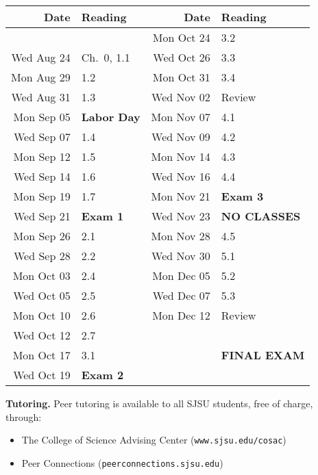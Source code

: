 \documentclass[letterpaper]{article}
\begin{document}
\begin{center}
\begin{tabular}{|r|p{1.5in}||r|p{1.5in}|}\hline
Date & Reading & Date & Reading \\ \hline
 &  & 
  Mon Oct 24 & 3.2 \\
Wed Aug 24 & Ch.\ 0, 1.1 &
	Wed Oct 26 & 3.3 \\ \hline
%
Mon Aug 29 & 1.2 &
	Mon Oct 31 & 3.4 \\
Wed Aug 31 & 1.3 &
	Wed Nov 02 & Review \\ \hline
%
Mon Sep 05 & {\bf Labor Day\/} &
	Mon Nov 07 & 4.1 \\
Wed Sep 07 & 1.4 &
	Wed Nov 09 & 4.2 \\ \hline
%
Mon Sep 12 & 1.5 &
	Mon Nov 14 & 4.3 \\
Wed Sep 14 & 1.6 &
	Wed Nov 16 & 4.4 \\ \hline
%
Mon Sep 19 & 1.7 &
	Mon Nov 21 & {\bf Exam 3\/} \\
Wed Sep 21 & {\bf Exam 1\/} &
	Wed Nov 23 & {\bf NO CLASSES\/} \\ \hline
%
Mon Sep 26 & 2.1 &
	Mon Nov 28 & 4.5 \\
Wed Sep 28 & 2.2 &
	Wed Nov 30 & 5.1 \\ \hline
%
Mon Oct 03 & 2.4 &
	Mon Dec 05 & 5.2 \\
Wed Oct 05 & 2.5 &
	Wed Dec 07 & 5.3 \\ \hline
%
Mon Oct 10 & 2.6 &
  Mon Dec 12 & Review \\
Wed Oct 12 & 2.7 &
   &  \\ \hline
%
Mon Oct 17 & 3.1 &
	{\bf \finaldate\/} & {\bf FINAL EXAM} \\
Wed Oct 19 & {\bf Exam 2\/} &
	& {\bf \finaltime\/} \\ \hline
\end{tabular}
\end{center}

{\bf Tutoring.\/} Peer tutoring is available to all SJSU
students, free of charge, through:
\begin{itemize}
\item The College of Science Advising Center ({\tt www.sjsu.edu/cosac\/})
\item Peer Connections ({\tt peerconnections.sjsu.edu\/})
\end{itemize}
\end{document}
